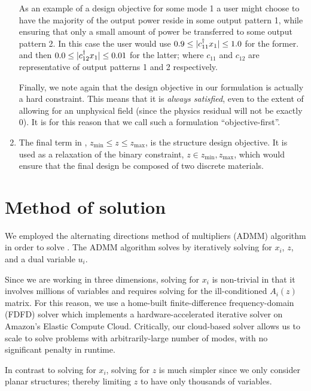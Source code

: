 \documentclass[letterpaper,10pt]{article}
\begin{document}
\begin{enumerate}
    As an example of a design objective for some mode 1 
        a user might choose to have the majority of the output power
        reside in some output pattern 1,
        while ensuring that only a small amount of power 
        be transferred to some output pattern 2.
    In this case the user would use 
        $0.9 \le |c_{11}^\dagger x_1| \le 1.0$ for the former.
        and then $0.0 \le |c_{12}^\dagger x_1| \le 0.01$ for the latter;
        where $c_{11}$ and $c_{12}$ are representative of 
        output patterns 1 and 2 respectively.
        
    Finally, we note again that the design objective in our formulation
        is actually a hard constraint.
    This means that it is \emph{always satisfied}, 
        even to the extent of allowing for an unphysical field 
        (since the physics residual will not be exactly 0).
    It is for this reason that we call such a formulation ``objective-first''.

\item 
    The final term in , $z_\text{min} \le z \le z_\text{max}$,
        is the structure design objective.
    It is used as a relaxation of the binary constraint,
        $z \in {z_\text{min}, z_\text{max}}$,
        which would ensure that the final design be composed 
        of two discrete materials.
\end{enumerate}

\section{Method of solution}
We employed the alternating directions method of multipliers (ADMM) algorithm %
    in order to solve .
The ADMM algorithm solves  by iteratively solving for 
    $x_i$, $z$, and a dual variable $u_i$.

Since we are working in three dimensions, solving  for $x_i$ 
    is non-trivial in that it involves millions of variables and
    requires solving for the ill-conditioned $A_i(z)$ matrix.
For this reason, we use a home-built
    finite-difference frequency-domain (FDFD) solver which 
    implements a hardware-accelerated iterative solver %
    on Amazon's Elastic Compute Cloud.
Critically, our cloud-based solver allows us to scale to solve problems
    with arbitrarily-large number of modes,
    with no significant penalty in runtime.

In contrast to solving for $x_i$, solving for $z$ is much simpler since we
    only consider planar structures;
    thereby limiting $z$ to have only thousands of variables.
\end{document}
